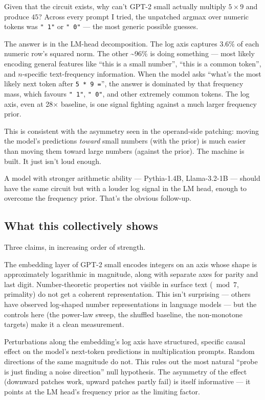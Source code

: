 \documentclass[
]{article}
\begin{document}
Given that the circuit exists, why can't GPT-2 small actually multiply
\(5 \times 9\) and produce \(45\)? Across every prompt I tried, the
unpatched argmax over numeric tokens was \texttt{"\ 1"} or
\texttt{"\ 0"} --- the most generic possible guesses.

The answer is in the LM-head decomposition. The log axis captures 3.6\%
of each numeric row's squared norm. The other \textasciitilde96\% is
doing something --- most likely encoding general features like ``this is
a small number'', ``this is a common token'', and \(n\)-specific
text-frequency information. When the model asks ``what's the most likely
next token after \texttt{5\ *\ 9\ =}'', the answer is dominated by that
frequency mass, which favours \texttt{"\ 1"}, \texttt{"\ 0"}, and other
extremely common tokens. The log axis, even at 28\(\times\) baseline, is
one signal fighting against a much larger frequency prior.

This is consistent with the asymmetry seen in the operand-side patching:
moving the model's predictions \emph{toward} small numbers (with the
prior) is much easier than moving them toward large numbers (against the
prior). The machine is built. It just isn't loud enough.

A model with stronger arithmetic ability --- Pythia-1.4B, Llama-3.2-1B
--- should have the same circuit but with a louder log signal in the LM
head, enough to overcome the frequency prior. That's the obvious
follow-up.

\subsection{What this collectively shows}\label{sec-synthesis}

Three claims, in increasing order of strength.

The embedding layer of GPT-2 small encodes integers on an axis whose
shape is approximately logarithmic in magnitude, along with separate
axes for parity and last digit. Number-theoretic properties not visible
in surface text (\(\bmod 7\), primality) do not get a coherent
representation. This isn't surprising --- others have observed
log-shaped number representations in language models --- but the
controls here (the power-law sweep, the shuffled baseline, the
non-monotone targets) make it a clean measurement.

Perturbations along the embedding's log axis have structured, specific
causal effect on the model's next-token predictions in multiplication
prompts. Random directions of the same magnitude do not. This rules out
the most natural ``probe is just finding a noise direction'' null
hypothesis. The asymmetry of the effect (downward patches work, upward
patches partly fail) is itself informative --- it points at the LM
head's frequency prior as the limiting factor.
\end{document}
